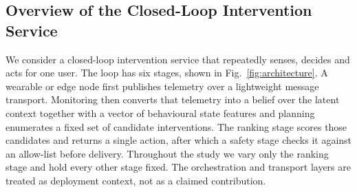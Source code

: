 \documentclass[journal]{IEEEtran}
\begin{document}
\subsection{Overview of the Closed-Loop Intervention Service}
\label{sec:loop}

We consider a closed-loop intervention service that repeatedly senses, decides and acts for one user.
The loop has six stages, shown in Fig.~\ref{fig:architecture}.
A wearable or edge node first publishes telemetry over a lightweight message transport.
Monitoring then converts that telemetry into a belief over the latent context together with a vector of behavioural state features and planning enumerates a fixed set of candidate interventions.
The ranking stage scores those candidates and returns a single action, after which a safety stage checks it against an allow-list before delivery.
Throughout the study we vary only the ranking stage and hold every other stage fixed.
The orchestration and transport layers are treated as deployment context, not as a claimed contribution.
\end{document}
